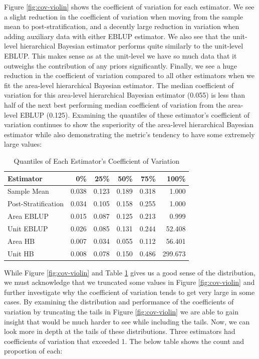 \documentclass[12pt,twoside]{reedthesis}
\begin{document}
Figure \ref{fig:cov-violin} shows the coefficient of variation for each estimator. We see a slight reduction in the coefficient of variation when moving from the sample mean to post-stratification, and a decently large reduction in variation when adding auxiliary data with either EBLUP estimator. We also see that the unit-level hierarchical Bayesian estimator performs quite similarly to the unit-level EBLUP. This makes sense as at the unit-level we have so much data that it outweighs the contribution of any priors significantly. Finally, we see a huge reduction in the coefficient of variation compared to all other estimators when we fit the area-level hierarchical Bayesian estimator. The median coefficient of variation for this area-level hierarchical Bayesian estimator (0.055) is less than half of the next best performing median coefficient of variation from the area-level EBLUP (0.125). Examining the quantiles of these estimator's coefficient of variation continues to show the superiority of the area-level hierarchical Bayesian estimator while also demonstrating the metric's tendency to have some extremely large values:
\begin{longtable}[t]{lrrrrr}
\caption[Coefficient of Variation Quantiles]{\label{tab:quantile-table}Quantiles of Each Estimator's Coefficient of Variation}\\
\toprule
Estimator & 0\% & 25\% & 50\% & 75\% & 100\%\\
\midrule
Sample Mean & 0.038 & 0.123 & 0.189 & 0.318 & 1.000\\
Post-Stratification & 0.034 & 0.105 & 0.158 & 0.255 & 1.000\\
Area EBLUP & 0.015 & 0.087 & 0.125 & 0.213 & 0.999\\
Unit EBLUP & 0.026 & 0.085 & 0.131 & 0.244 & 52.408\\
Area HB & 0.007 & 0.034 & 0.055 & 0.112 & 56.401\\
\addlinespace
Unit HB & 0.008 & 0.078 & 0.150 & 0.486 & 299.673\\
\bottomrule
\end{longtable}
While Figure \ref{fig:cov-violin} and Table \ref{tab:quantile-table} gives us a good sense of the distribution, we must acknowledge that we truncated some values in Figure \ref{fig:cov-violin} and further investigate why the coefficient of variation tends to get very large in some cases. By examining the distribution and performance of the coefficients of variation by truncating the tails in Figure \ref{fig:cov-violin} we are able to gain insight that would be much harder to see while including the tails. Now, we can look more in depth at the tails of these distributions. Three estimators had coefficients of variation that exceeded 1. The below table shows the count and proportion of each:
\end{document}

